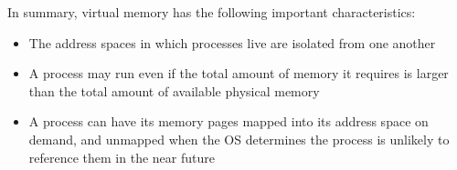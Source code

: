 \documentclass[shortabstract, english]{iithesis}
\begin{document}
In summary, virtual memory has the following important characteristics:
\begin{itemize}
\item The address spaces in which processes live are isolated from one another
\item A process may run even if the total amount of memory it requires is larger
  than the total amount of available physical memory
\item A process can have its memory pages mapped into its address space on
  demand, and unmapped when the OS determines the process is unlikely to
  reference them in the near future
\end{itemize}


\end{document}
